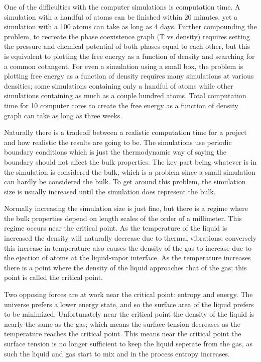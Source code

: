 One of the difficulties with the computer simulations is computation time. A simulation with a handful of atoms can be finished within 20 minutes, yet a simulation with a 100 atoms can take as long as 4 days. Further compounding the problem, to recreate the phase coexistence graph (T vs density) requires setting the pressure and chemical potential of both phases equal to each other, but this is equivalent to plotting the free energy as a function of density and searching for a common cotangent. For even a simulation using a small box, the problem is plotting free energy as a function of density requires many simulations at various densities; some simulations containing only a handful of atoms while other simulations containing as much as a couple hundred atoms. Total computation time for 10 computer cores to create the free energy as a function of density graph can take as long as three weeks.

Naturally there is a tradeoff between a realistic computation time for a project and how realistic the results are going to be. The simulations use periodic boundary conditions which is just the thermodynamic way of saying the boundary should not affect the bulk properties. The key part being whatever is in the simulation is considered the bulk, which is a problem since a small simulation can hardly be considered the bulk. To get around this problem, the simulation size is usually increased until the simulation does represent the bulk. 

Normally increasing the simulation size is just fine, but there is a regime where the bulk properties depend on length scales of the order of a millimeter. This regime occurs near the critical point. As the temperature of the liquid is increased the density will naturally decrease due to thermal vibrations; conversely this increase in temperature also causes the density of the gas to increase due to the ejection of atoms at the liquid-vapor interface. As the temperature increases there is a point where the density of the liquid approaches that of the gas; this point is called the critical point.

Two opposing forces are at work near the critical point: entropy and energy. The universe prefers a lower energy state, and so the surface area of the liquid prefers to be minimized. Unfortunately near the critical point the density of the liquid is nearly the same as the gas; which means the surface tension decreases as the temperature reaches the critical point. This means near the critical point the surface tension is no longer sufficient to keep the liquid seperate from the gas, as such the liquid and gas start to mix and in the process entropy increases. 

